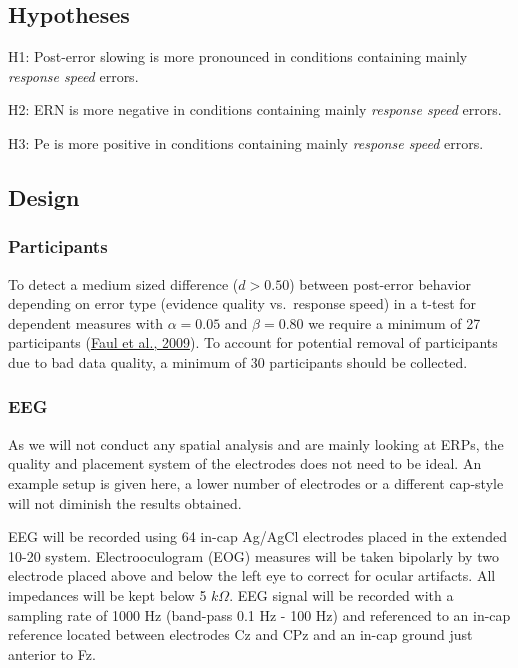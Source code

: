 \documentclass[
  man,floatsintext]{apa7}
\begin{document}
\hypertarget{hypotheses}{%
\subsection{Hypotheses}\label{hypotheses}}

H1: Post-error slowing is more pronounced in conditions containing mainly \emph{response speed} errors.

H2: ERN is more negative in conditions containing mainly \emph{response speed} errors.

H3: Pe is more positive in conditions containing mainly \emph{response speed} errors.

\hypertarget{design}{%
\subsection{Design}\label{design}}

\hypertarget{participants}{%
\subsubsection{Participants}\label{participants}}

To detect a medium sized difference (\(d > 0.50\)) between post-error behavior depending on error type (evidence quality vs.~response speed) in a t-test for dependent measures with \(\alpha = 0.05\) and \(\beta = 0.80\) we require a minimum of 27 participants (\protect\hyperlink{ref-faul2009statistical}{Faul et al., 2009}). To account for potential removal of participants due to bad data quality, a minimum of 30 participants should be collected.

\hypertarget{eeg}{%
\subsubsection{EEG}\label{eeg}}

As we will not conduct any spatial analysis and are mainly looking at ERPs, the quality and placement system of the electrodes does not need to be ideal. An example setup is given here, a lower number of electrodes or a different cap-style will not diminish the results obtained.

EEG will be recorded using 64 in-cap Ag/AgCl electrodes placed in the extended 10-20 system. Electrooculogram (EOG) measures will be taken bipolarly by two electrode placed above and below the left eye to correct for ocular artifacts. All impedances will be kept below 5 \(k\Omega\). EEG signal will be recorded with a sampling rate of 1000 Hz (band-pass 0.1 Hz - 100 Hz) and referenced to an in-cap reference located between electrodes Cz and CPz and an in-cap ground just anterior to Fz.
\end{document}
